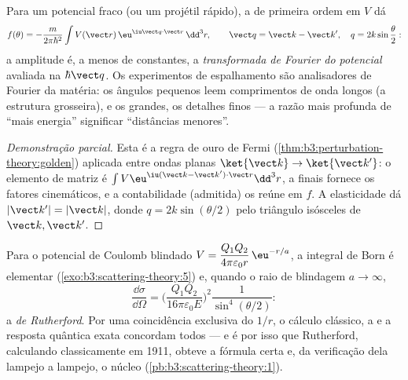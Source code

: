 \begin{theorem}\label{thm:b3:scattering-theory:born}
Para um potencial fraco (ou um projétil rápido), a  de primeira ordem em $V$ dá
\[
f(\theta) = -\frac{m}{2\pi\hbar^2}
\int V(\vect r)\,\eu^{\iu\vect q\cdot\vect r}\,\dd^3r ,
\qquad
\vect q = \vect k - \vect k' , \quad
q = 2k\sin\frac\theta2 :
\]
a amplitude é, a menos de constantes, a \emph{transformada de Fourier
do potencial} avaliada na  $\hbar\vect q$. Os
experimentos de espalhamento são analisadores de Fourier da matéria:
os ângulos pequenos leem comprimentos de onda longos (a estrutura
grosseira), e os grandes, os detalhes finos --- a razão mais profunda
de ``mais energia'' significar ``distâncias menores''.
\end{theorem}

\begin{proof}[Demonstração parcial]
Esta é a regra de ouro de Fermi
(\cref{thm:b3:perturbation-theory:golden}) aplicada entre ondas planas
$\ket{\vect k} \to \ket{\vect k'}$: o elemento de matriz é
$\int V\eu^{\iu(\vect k - \vect k')\cdot\vect r}\dd^3r$, a  finais fornece os fatores cinemáticos, e a contabilidade
(admitida) os reúne em $f$. A elasticidade dá
$|\vect k'| = |\vect k|$, donde $q = 2k\sin(\theta/2)$ pelo triângulo
isósceles de $\vect k, \vect k'$.
\end{proof}

\begin{example}\label{ex:b3:scattering-theory:rutherford}
Para o potencial de Coulomb blindado $V = \dfrac{Q_1Q_2}{4\pi
\varepsilon_0 r}\,\eu^{-r/a}$, a integral de Born é elementar
(\cref{exo:b3:scattering-theory:5}) e, quando o raio de blindagem
$a \to \infty$,
\[
\frac{\dd\sigma}{\dd\Omega} =
\Big(\frac{Q_1Q_2}{16\pi\varepsilon_0 E}\Big)^2
\frac{1}{\sin^4(\theta/2)} :
\]
a \emph{ de Rutherford}. Por uma coincidência exclusiva
do $1/r$, o cálculo clássico, a  e a resposta
quântica exata concordam todos --- e é por isso que Rutherford,
calculando classicamente em 1911, obteve a fórmula certa e, da
verificação dela lampejo a lampejo, o núcleo
(\cref{pb:b3:scattering-theory:1}).
\end{example}

